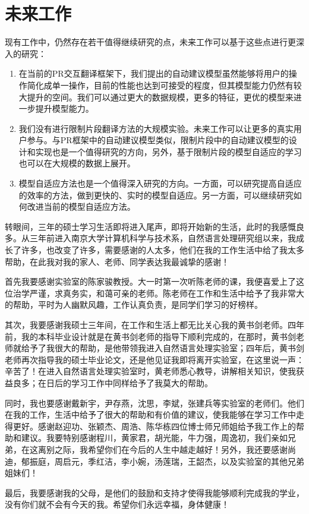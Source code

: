 \documentclass[master, winfont]{njuthesis}
\begin{document}
\section{未来工作}
现有工作中，仍然存在若干值得继续研究的点，未来工作可以基于这些点进行更深入的研究：
\begin{enumerate}
  \item 在当前的PR交互翻译框架下，我们提出的自动建议模型虽然能够将用户的操作简化成单一操作，目前的性能也达到可接受的程度，但其模型能力仍然有较大提升的空间。我们可以通过更大的数据规模，更多的特征，更优的模型来进一步提升模型能力。
  \item 我们没有进行限制片段翻译方法的大规模实验。未来工作可以让更多的真实用户参与。与PR框架中的自动建议模型类似，限制片段中的自动建议模型的设计和实现也是一个值得研究的方向，另外，基于限制片段的模型自适应的学习也可以在大规模的数据上展开。
  \item 模型自适应方法也是一个值得深入研究的方向。一方面，可以研究提高自适应的效率的方法，做到更快的、实时的模型自适应。另一方面，可以继续研究如何改进当前的模型自适应方法。
\end{enumerate}
\nocite{*}

%
%
\begin{acknowledgement}
  转眼间，三年的硕士学习生活即将进入尾声，即将开始新的生活，此时的我感慨良多。从三年前进入南京大学计算机科学与技术系，自然语言处理研究组以来，我成长了许多，也改变了许多，需要感谢的人太多，他们在我的工作生活中给了我太多帮助，在此我对我的家人、老师、同学表达我最诚挚的感谢！

  首先我要感谢实验室的陈家骏教授。大一时第一次听陈老师的课，我便喜爱上了这位治学严谨，求真务实，和蔼可亲的老师。陈老师在工作和生活中给予了我非常大的帮助，平时为人幽默风趣，工作认真负责，是同学们学习的好榜样。

  其次，我要感谢我硕士三年间，在工作和生活上都无比关心我的黄书剑老师。四年前，我的本科毕业设计就是在黄书剑老师的指导下顺利完成的，在那时，黄书剑老师就给予了我很大的帮助，是他带领我进入自然语言处理实验室；四年后，黄书剑老师再次指导我的硕士毕业论文，还是他见证我即将离开实验室，在这里说一声：辛苦了！在进入自然语言处理实验室时，黄老师悉心教导，讲解相关知识，使我获益良多；在日后的学习工作中同样给予了我莫大的帮助。

  同时，我也要感谢戴新宇，尹存燕，沈思，李斌，张建兵等实验室的老师们。他们在我的工作，生活中给予了很大的帮助和有价值的建议，使我能够在学习工作中走得更好。感谢赵迎功、张颖杰、周浩、陈华栋四位博士师兄师姐给予我工作上的帮助和建议。我要特别感谢程川，黄家君，胡光能，牛力强，周逸初，我们亲如兄弟，在这离别之际，我希望你们在今后的人生中越走越好！另外，我还要感谢尚迪，郁振庭，周启元，季红洁，李小婉，汤莲瑞，王韶杰，以及实验室的其他兄弟姐妹们！

  最后，我要感谢我的父母，是他们的鼓励和支持才使得我能够顺利完成我的学业，没有你们就不会有今天的我。希望你们永远幸福，身体健康！
\end{acknowledgement}
\end{document}
